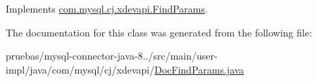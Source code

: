 Implements \mbox{\hyperlink{interfacecom_1_1mysql_1_1cj_1_1xdevapi_1_1_find_params_a8326dbc363863872a177b89345f6f419}{com.\+mysql.\+cj.\+xdevapi.\+Find\+Params}}.



The documentation for this class was generated from the following file\+:\begin{DoxyCompactItemize}
\item 
pruebas/mysql-\/connector-\/java-\/8../src/main/user-\/impl/java/com/mysql/cj/xdevapi/\mbox{\hyperlink{_doc_find_params_8java}{Doc\+Find\+Params.\+java}}\end{DoxyCompactItemize}

